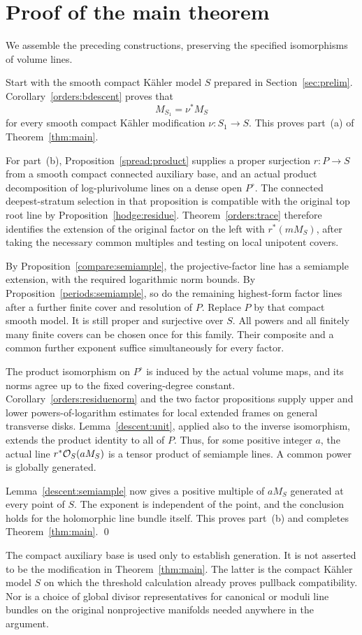 \section{Proof of the main theorem}\label{sec:conclusion}

We assemble the preceding constructions, preserving the specified
isomorphisms of volume lines.

Start with the smooth compact K\"ahler model \(S\) prepared in
Section~\ref{sec:prelim}. Corollary~\ref{orders:bdescent} proves that
\[
 M_{S_1}=\nu^*M_S
\]
for every smooth compact K\"ahler modification \(\nu:S_1\to S\).
This proves part~\textup{(a)} of Theorem~\ref{thm:main}.

For part~\textup{(b)}, Proposition~\ref{spread:product} supplies a
proper surjection \(r:P\to S\) from a smooth compact connected
auxiliary base, and an actual product decomposition of log-plurivolume
lines on a dense open \(P^\circ\). The connected deepest-stratum
selection in that proposition is compatible with the original
top root line by Proposition~\ref{hodge:residue}.
Theorem~\ref{orders:trace} therefore identifies the extension of
the original factor on the left with \(r^*(mM_S)\), after taking
the necessary common multiples and testing on local unipotent
covers.

By Proposition~\ref{compare:semiample}, the projective-factor line
has a semiample extension, with the required logarithmic norm
bounds. By Proposition~\ref{periods:semiample}, so do the remaining
highest-form factor lines after a further finite cover and
resolution of \(P\). Replace \(P\) by that compact smooth model.
It is still proper and surjective over \(S\).
All powers and all finitely many finite covers can be chosen once
for this family. Their composite and a common further exponent
suffice simultaneously for every factor.

The product isomorphism on \(P^\circ\) is induced by the actual
volume maps, and its norms agree up to the fixed covering-degree
constant. Corollary~\ref{orders:residuenorm} and the two factor
propositions supply upper and lower powers-of-logarithm estimates
for local extended frames on general transverse disks.
Lemma~\ref{descent:unit}, applied also to the inverse isomorphism,
extends the product identity to all of \(P\).
Thus, for some positive integer \(a\), the actual line
\(r^*\mathcal O_S(aM_S)\) is a tensor product of semiample lines.
A common power is globally generated.

Lemma~\ref{descent:semiample} now gives a positive multiple of
\(aM_S\) generated at every point of \(S\).
The exponent is independent of the point, and the conclusion
holds for the holomorphic line bundle itself.
This proves part~\textup{(b)} and completes
Theorem~\ref{thm:main}.
\qed

\begin{remark}
The compact auxiliary base is used only to establish generation.
It is not asserted to be the modification in
Theorem~\ref{thm:main}. The latter is the compact K\"ahler model
\(S\) on which the threshold calculation already proves pullback
compatibility. Nor is a choice of global divisor representatives
for canonical or moduli line bundles on the original nonprojective
manifolds needed anywhere in the argument.
\end{remark}
